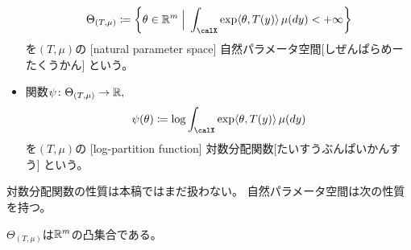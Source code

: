 \documentclass[report]{jlreq}
\begin{document}
\begin{definition}[指数型分布族]
\begin{itemize}
\begin{equation}
                \Theta_{(T, \mu)}
                    \coloneqq \mybrace{
                        \theta \in \R^m
                        \;\Big|\;
                        \int_\calX \exp \langle \theta, T(y) \rangle \, \mu(dy) < +\infty
                    }
            \end{equation}
            を$(T, \mu)$の
            [natural parameter space]
            {自然パラメータ空間}[しぜんぱらめーたくうかん]
            という。
        \item 関数$\psi \colon \Theta_{(T, \mu)} \to \mathbb{R},$
            \begin{equation}
                \psi(\theta)
                    \coloneqq
                    \log \int_\calX \exp \langle \theta, T(y) \rangle \, \mu(dy)
            \end{equation}
            を$(T, \mu)$の
            [log-partition function]
            {対数分配関数}[たいすうぶんぱいかんすう]
            という。
    \end{itemize}
\end{definition}

対数分配関数の性質は本稿ではまだ扱わない。
自然パラメータ空間は次の性質を持つ。

\begin{proposition}[自然パラメータ空間は凸集合]
    $\Theta_{(T, \mu)}$は$\mathbb{R}^m$の凸集合である。
\end{proposition}
\end{document}
